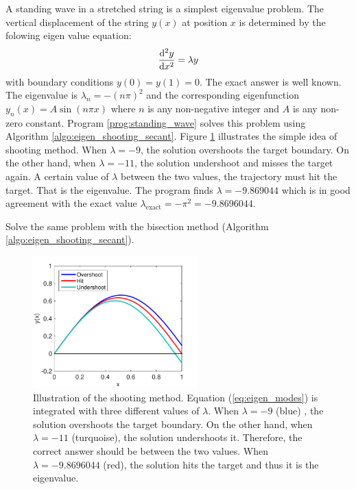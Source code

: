 \bigskip
\begin{example}\label{eq:eigen_modes}
	A standing wave in a stretched string is a simplest eigenvalue problem.  The vertical displacement of the string $y(x)$ at position $x$ is determined by the folowing eigen value equation:
	\begin{equation}\label{eq:eigen_modes}
	   \dv[2]{y}{x} = \lambda y
	\end{equation}
	with boundary conditions $y(0)=y(1)=0$.  The exact answer is well known. The eigenvalue is $\lambda_n = - (n \pi)^2$ and the corresponding eigenfunction  $y_n(x) = A \sin (n \pi  x)$ where $n$ is any non-negative integer and $A$ is any non-zero constant.
	Program \ref{prog:standing_wave} solves this problem using Algorithm \ref{algo:eigen_shooting_secant}.  Figure \ref{fig:shooting} illustrates the simple idea of shooting method.  When $\lambda=-9$, the solution overshoots the target boundary.  On the other hand, when $\lambda = -11$, the solution undershoot and misses the target again.  A certain value of $\lambda$ between the two values, the trajectory must hit the target.  That is the eigenvalue.  The program finds $\lambda=-9.869044$ which is in good agreement with the exact value $\lambda_\text{exact} = - \pi^2=-9.8696044$.
	
	\bigskip
	\exercise Solve the same problem with the bisection method (Algorithm \ref{algo:eigen_shooting_secant}).
	
   \vfill
   
\end{example}

	\begin{figure}[tb]
		\centering
		\includegraphics[width=2.5in]{07.ode3/shooting.pdf}
		\caption{Illustration of the shooting method. Equation (\ref{eq:eigen_modes}) is integrated with three different values of $\lambda$.  When $\lambda=-9$ (blue) , the solution overshoots the target boundary.  On the other hand, when $\lambda = -11$ (turquoise), the solution undershoots it. Therefore, the correct answer should be between the two values. When $\lambda=-9.8696044$ (red), the solution hits the target and thus it is the eigenvalue.}
		\label{fig:shooting}
	\end{figure}
	


